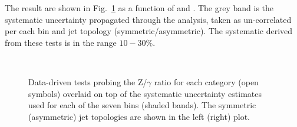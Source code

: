 The result are shown in Fig.~\ref{fig:closurePhoToMuMu} as a function of \scalht and \njet. 
The grey band is the systematic uncertainty propagated through the analysis, 
taken as un-correlated per each \scalht bin and jet topology (symmetric/asymmetric). The systematic derived from these tests is
in the range $10-30\%$.


\begin{figure}[h!]
  \begin{center}
    ~~
    \caption{Data-driven tests probing the Z/$\gamma$ ratio for each
      \njet category (open symbols) overlaid on top of the systematic
      uncertainty estimates used for each of the seven \scalht bins
      (shaded bands). 
      The symmetric (asymmetric) jet topologies are shown in the left (right) plot.      
    }
    \label{fig:closurePhoToMuMu}
  \end{center} 
\end{figure}





